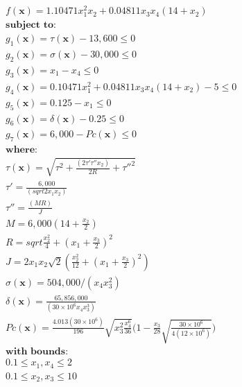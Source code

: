 \begin{equation*}
\begin{aligned}
& f(\bm{x}) = 1.10471x_1^2x_2 + 0.04811x_3x_4(14 + x_2) \\[0.5em]
& \textbf{subject to:} \\
& g_1(\bm{x}) = \tau(\bm{x}) - 13,600 \leq 0 \\
& g_2(\bm{x}) = \sigma(\bm{x}) - 30,000 \leq 0 \\
& g_3(\bm{x}) = x_1 - x_4 \leq 0 \\
& g_4(\bm{x}) = 0.10471x_1^2 + 0.04811x_3x_4(14+x_2) - 5  \leq 0 \\
& g_5(\bm{x}) = 0.125 - x_1 \leq 0 \\
& g_6(\bm{x}) = \delta(\bm{x}) - 0.25 \leq 0 \\
& g_7(\bm{x}) = 6,000 - Pc(\bm{x}) \leq 0 \\[0.5em]
& \textbf{where:} \\
& \tau(\bm{x}) = \sqrt{\tau^2 + \frac{(2 \tau' \tau'' x_2)}{2R} + \tau''^2 } \\
& \tau' = \frac{6,000}{(sqrt{2} x_1 x_2)} \\[0.5em]
& \tau'' = \frac{(M R)}{J} \\
& M = 6,000 (14 + \frac{x_2}{2}) \\
& R = sqrt{\frac{x_2^2}{4} + (x_1 + \frac{x_3}{2})^2} \\
& J = 2 x_1 x_2 \sqrt{2} (\frac{x_2^2}{12} + (x_1 + \frac{x_3}{2})^2) \\[0.5em]
& \sigma(\bm{x}) = 504,000 / (x_4 x_3^2) \\
& \delta(\bm{x}) = \frac{65,856,000}{(30 \times 10^6 x_4 x_3^3)} \\
& Pc(\bm{x}) = \frac{4.013(30 \times 10^6)}{196} \sqrt{x_3^2 \frac{x_4^6}{36}} \Bigg(1 - \frac{x_3}{28} \sqrt{\frac{30 \times 10^6}{4(12 \times 10^6)}}\Bigg) \\[0.5em]
& \textbf{with bounds:} \\
&  0.1 \leq x_1, x_4 \leq 2 \\
&  0.1 \leq x_2, x_3 \leq 10
\end{aligned}
\end{equation*}